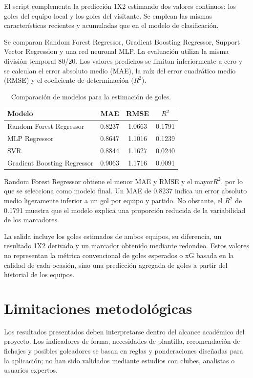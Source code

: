 El script  complementa la predicción 1X2 estimando dos valores continuos: los goles del equipo local y los goles del visitante. Se emplean las mismas características recientes y acumuladas que en el modelo de clasificación.

Se comparan Random Forest Regressor, Gradient Boosting Regressor, Support Vector Regression y una red neuronal MLP. La evaluación utiliza la misma división temporal 80/20. Los valores predichos se limitan inferiormente a cero y se calculan el error absoluto medio (MAE), la raíz del error cuadrático medio (RMSE) y el coeficiente de determinación ($R^2$).

\begin{table}[H]
\centering
\caption{Comparación de modelos para la estimación de goles.}
\label{tab:evaluacion_goles_estimados}
\begin{tabular}{|l|c|c|c|}
\hline
\textbf{Modelo} & \textbf{MAE} & \textbf{RMSE} & \textbf{$R^2$} \\
\hline
Random Forest Regressor & 0.8237 & 1.0663 & 0.1791 \\
\hline
MLP Regressor & 0.8647 & 1.1016 & 0.1239 \\
\hline
SVR & 0.8844 & 1.1627 & 0.0240 \\
\hline
Gradient Boosting Regressor & 0.9063 & 1.1716 & 0.0091 \\
\hline
\end{tabular}
\end{table}

Random Forest Regressor obtiene el menor MAE y RMSE y el mayor$R^2$, por lo que se selecciona como modelo final. Un MAE de 0.8237 indica un error absoluto medio ligeramente inferior a un gol por equipo y partido. No obstante, el $R^2$ de 0.1791 muestra que el modelo explica una proporción reducida de la variabilidad de los marcadores.

La salida incluye los goles estimados de ambos equipos, su diferencia, un resultado 1X2 derivado y un marcador obtenido mediante redondeo. Estos valores no representan la métrica convencional de goles esperados o xG basada en la calidad de cada ocasión, sino una predicción agregada de goles a partir del historial de los equipos.

\section{Limitaciones metodológicas}

Los resultados presentados deben interpretarse dentro del alcance académico del proyecto. Los indicadores de forma, necesidades de plantilla, recomendación de fichajes y posibles goleadores se basan en reglas y ponderaciones diseñadas para la aplicación; no han sido validados mediante estudios con clubes, analistas o usuarios expertos.

